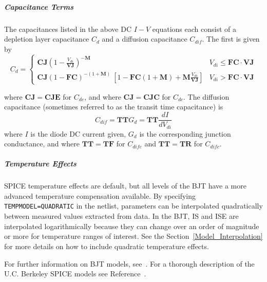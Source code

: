 \subparagraph{Capacitance Terms}
The capacitances listed in the above DC $I-V$ equations each consist of a
depletion layer capacitance $C_{d}$ and
a diffusion capacitance $C_{dif}$.  The first is given by
\[
C_d = \left\{
\begin{array}{ll}
\mathbf{CJ} \left(1 - \frac{V_{di}}{\mathbf{VJ}} \right)^{\mathbf{-M}} &
V_{di} \leq \mathbf{FC \cdot VJ} \\
\mathbf{CJ} \left(1 - \mathbf{FC} \right)^{-(1+\mathbf{M})} \
\left[1 - \mathbf{FC}(1 + \mathbf{M}) + \mathbf{M}
\frac{V_{di}}{\mathbf{VJ}} \right]
& V_{di} > \mathbf{FC \cdot VJ}
\end{array}
\right. \]

where $\mathbf{CJ}=\mathbf{CJE}$ for $C_{de}$, and where $\mathbf{CJ}=
\mathbf{CJC}$ for $C_{dc}$.
The diffusion capacitance (sometimes referred to as the transit time
capacitance) is
\[
C_{dif} = \mathbf{TT} G_d = \mathbf{TT} \frac{dI}{dV_{di}}
\]
where $I$ is the diode DC current given, $G_d$ is the corresponding junction
conductance, and where $\mathbf{TT}=\mathbf{TF}$ for $C_{dife}$ and
$\mathbf{TT}=\mathbf{TR}$ for $C_{difc}$.

\subparagraph{Temperature Effects}
SPICE temperature effects are default, but all levels of the BJT have a more
advanced temperature compensation available.  By specifying
\texttt{TEMPMODEL=QUADRATIC} in the netlist, parameters can be interpolated
quadratically between measured values extracted from data.  In the BJT, IS and
ISE are interpolated logarithmically because they can change over an order of
magnitude or more for temperature ranges of interest.  See the
Section~\ref{Model_Interpolation} for more details on how to include quadratic
temperature effects.




For further information on BJT models, see~\cite{Grove:1967}.  For a thorough
description of the U.C. Berkeley SPICE models see
Reference~\cite{Antognetti:1988}.

